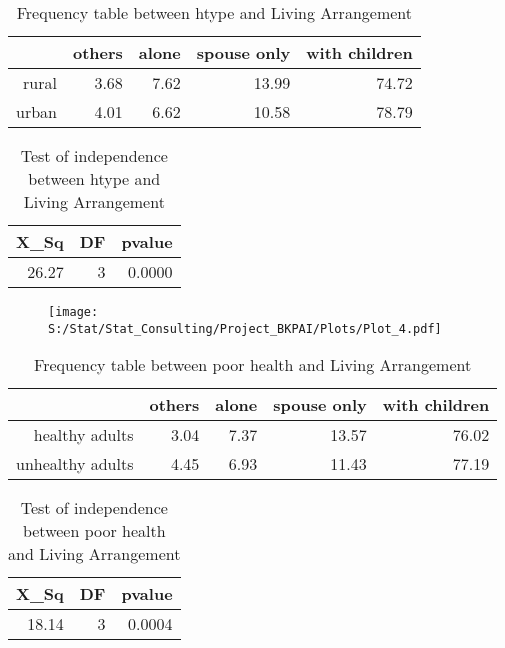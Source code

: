 \documentclass[11pt]{article}
\begin{document}
\begin{table}[H]
\centering
\begin{tabular}{rrrrr}
  \hline
 & others & alone & spouse only & with children \\ 
  \hline
rural & 3.68 & 7.62 & 13.99 & 74.72 \\ 
  urban & 4.01 & 6.62 & 10.58 & 78.79 \\ 
   \hline
\end{tabular}
\caption{Frequency table between htype and Living Arrangement} 
\end{table}
\begin{table}[H]
\centering
\begin{tabular}{rrr}
  \hline
X\_Sq & DF & pvalue \\ 
  \hline
26.27 & 3 & 0.0000 \\ 
   \hline
\end{tabular}
\caption{Test of independence between htype and Living Arrangement} 
\end{table}
\begin{center}
\begin{figure}[H]
\texttt{[image: S:/Stat/Stat\_Consulting/Project\_BKPAI/Plots/Plot\_4.pdf]}

\end{figure}
\end{center}
\begin{table}[H]
\centering
\begin{tabular}{rrrrr}
  \hline
 & others & alone & spouse only & with children \\ 
  \hline
healthy adults & 3.04 & 7.37 & 13.57 & 76.02 \\ 
  unhealthy adults & 4.45 & 6.93 & 11.43 & 77.19 \\ 
   \hline
\end{tabular}
\caption{Frequency table between poor health and Living Arrangement} 
\end{table}
\begin{table}[H]
\centering
\begin{tabular}{rrr}
  \hline
X\_Sq & DF & pvalue \\ 
  \hline
18.14 & 3 & 0.0004 \\ 
   \hline
\end{tabular}
\caption{Test of independence between poor health and Living Arrangement} 
\end{table}
\end{document}
